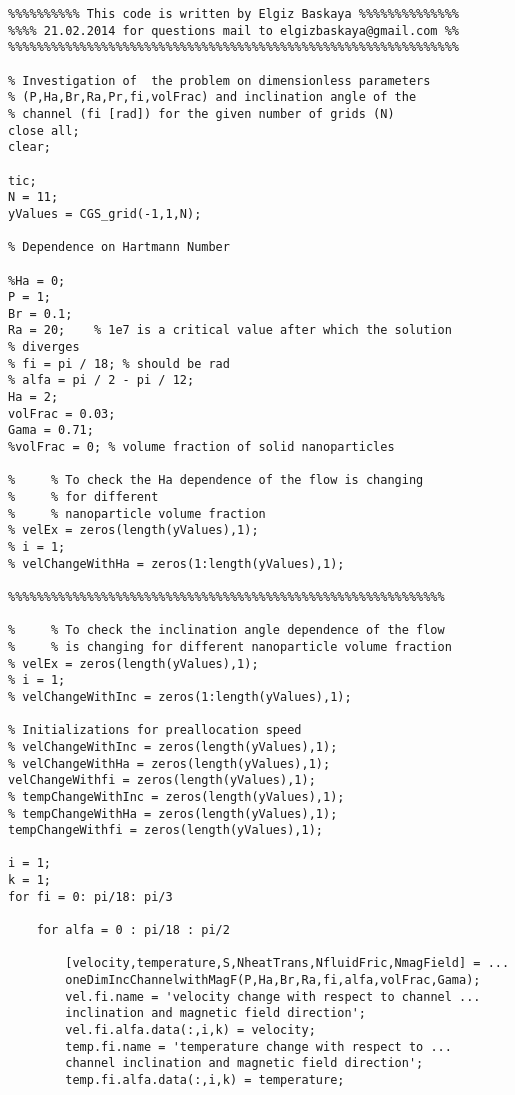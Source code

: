 \begin{lstlisting}
%%%%%%%%%% This code is written by Elgiz Baskaya %%%%%%%%%%%%%%
%%%% 21.02.2014 for questions mail to elgizbaskaya@gmail.com %%
%%%%%%%%%%%%%%%%%%%%%%%%%%%%%%%%%%%%%%%%%%%%%%%%%%%%%%%%%%%%%%%

% Investigation of  the problem on dimensionless parameters 
% (P,Ha,Br,Ra,Pr,fi,volFrac) and inclination angle of the 
% channel (fi [rad]) for the given number of grids (N)
close all;
clear;

tic;
N = 11;
yValues = CGS_grid(-1,1,N);

% Dependence on Hartmann Number

%Ha = 0;
P = 1;
Br = 0.1;
Ra = 20;    % 1e7 is a critical value after which the solution 
% diverges 
% fi = pi / 18; % should be rad
% alfa = pi / 2 - pi / 12;  
Ha = 2;
volFrac = 0.03;
Gama = 0.71;
%volFrac = 0; % volume fraction of solid nanoparticles

%     % To check the Ha dependence of the flow is changing 
%     % for different
%     % nanoparticle volume fraction
% velEx = zeros(length(yValues),1);
% i = 1;
% velChangeWithHa = zeros(1:length(yValues),1);

%%%%%%%%%%%%%%%%%%%%%%%%%%%%%%%%%%%%%%%%%%%%%%%%%%%%%%%%%%%%%

%     % To check the inclination angle dependence of the flow
%     % is changing for different nanoparticle volume fraction
% velEx = zeros(length(yValues),1);
% i = 1;
% velChangeWithInc = zeros(1:length(yValues),1);

% Initializations for preallocation speed
% velChangeWithInc = zeros(length(yValues),1);
% velChangeWithHa = zeros(length(yValues),1);
velChangeWithfi = zeros(length(yValues),1);
% tempChangeWithInc = zeros(length(yValues),1);
% tempChangeWithHa = zeros(length(yValues),1);
tempChangeWithfi = zeros(length(yValues),1);

i = 1;
k = 1;
for fi = 0: pi/18: pi/3 

    for alfa = 0 : pi/18 : pi/2
        
        [velocity,temperature,S,NheatTrans,NfluidFric,NmagField] = ...
        oneDimIncChannelwithMagF(P,Ha,Br,Ra,fi,alfa,volFrac,Gama);
        vel.fi.name = 'velocity change with respect to channel ...
        inclination and magnetic field direction';
        vel.fi.alfa.data(:,i,k) = velocity;
        temp.fi.name = 'temperature change with respect to ...
        channel inclination and magnetic field direction';
        temp.fi.alfa.data(:,i,k) = temperature;
        

\end{lstlisting}
